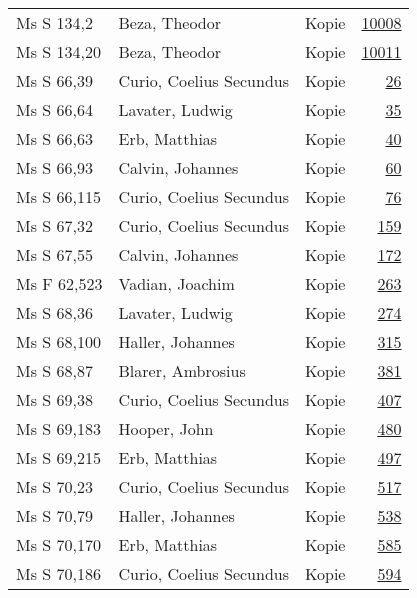 \documentclass[10pt,a4paper,landscape]{report}
\begin{document}
\begin{longtable}{p{16cm}p{4cm}lr}
Ms S 134,2	&	Beza, Theodor	&	Kopie	&	\href{http://130.60.24.72/assignment/10008}{10008}\\
Ms S 134,20	&	Beza, Theodor	&	Kopie	&	\href{http://130.60.24.72/assignment/10011}{10011}\\
Ms S 66,39	&	Curio, Coelius Secundus	&	Kopie	&	\href{http://130.60.24.72/assignment/26}{26}\\
Ms S 66,64	&	Lavater, Ludwig	&	Kopie	&	\href{http://130.60.24.72/assignment/35}{35}\\
Ms S 66,63	&	Erb, Matthias	&	Kopie	&	\href{http://130.60.24.72/assignment/40}{40}\\
Ms S 66,93	&	Calvin, Johannes	&	Kopie	&	\href{http://130.60.24.72/assignment/60}{60}\\
Ms S 66,115	&	Curio, Coelius Secundus	&	Kopie	&	\href{http://130.60.24.72/assignment/76}{76}\\
Ms S 67,32	&	Curio, Coelius Secundus	&	Kopie	&	\href{http://130.60.24.72/assignment/159}{159}\\
Ms S 67,55	&	Calvin, Johannes	&	Kopie	&	\href{http://130.60.24.72/assignment/172}{172}\\
Ms F 62,523	&	Vadian, Joachim	&	Kopie	&	\href{http://130.60.24.72/assignment/263}{263}\\
Ms S 68,36	&	Lavater, Ludwig	&	Kopie	&	\href{http://130.60.24.72/assignment/274}{274}\\
Ms S 68,100	&	Haller, Johannes	&	Kopie	&	\href{http://130.60.24.72/assignment/315}{315}\\
Ms S 68,87	&	Blarer, Ambrosius	&	Kopie	&	\href{http://130.60.24.72/assignment/381}{381}\\
Ms S 69,38	&	Curio, Coelius Secundus	&	Kopie	&	\href{http://130.60.24.72/assignment/407}{407}\\
Ms S 69,183	&	Hooper, John	&	Kopie	&	\href{http://130.60.24.72/assignment/480}{480}\\
Ms S 69,215	&	Erb, Matthias	&	Kopie	&	\href{http://130.60.24.72/assignment/497}{497}\\
Ms S 70,23	&	Curio, Coelius Secundus	&	Kopie	&	\href{http://130.60.24.72/assignment/517}{517}\\
Ms S 70,79	&	Haller, Johannes	&	Kopie	&	\href{http://130.60.24.72/assignment/538}{538}\\
Ms S 70,170	&	Erb, Matthias	&	Kopie	&	\href{http://130.60.24.72/assignment/585}{585}\\
Ms S 70,186	&	Curio, Coelius Secundus	&	Kopie	&	\href{http://130.60.24.72/assignment/594}{594}\\

\end{longtable}
\end{document}
